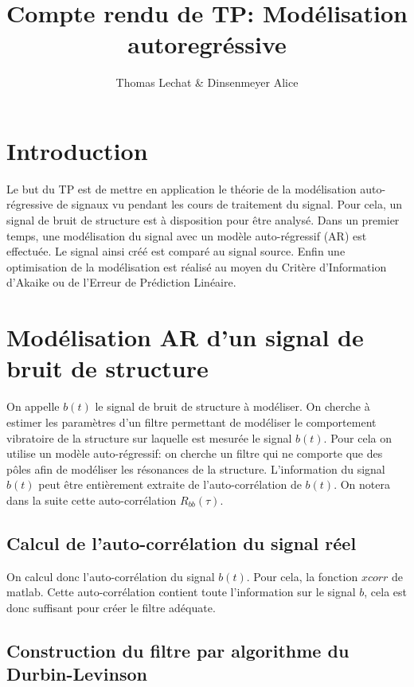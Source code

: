 \documentclass[a4paper]{article}
\title{Compte rendu de TP: Modélisation autoregréssive }
\author{Thomas Lechat \& Dinsenmeyer Alice}
\begin{document}
\maketitle



\section{Introduction}
Le but du TP est de mettre en application le théorie de la modélisation auto-régressive de signaux vu pendant les cours de traitement du signal. Pour cela, un signal de bruit de structure est à disposition pour être analysé. Dans un premier temps, une modélisation du signal avec un modèle auto-régressif (AR) est effectuée. Le signal ainsi créé est comparé au signal source. Enfin une optimisation de la modélisation est réalisé au moyen du Critère d'Information d'Akaike ou de l'Erreur de Prédiction Linéaire.

\section{Modélisation AR d'un signal de bruit de structure}
On appelle $b(t)$ le signal de bruit de structure à modéliser. On cherche à estimer les paramètres d'un filtre permettant de modéliser le comportement vibratoire de la structure sur laquelle est mesurée le signal $b(t)$. Pour cela on utilise un modèle auto-régressif: on cherche un filtre qui ne comporte que des pôles afin de modéliser les résonances de la structure. L'information du signal $b(t)$ peut être entièrement extraite de l'auto-corrélation de $b(t)$. On notera dans la suite cette auto-corrélation $R_{bb}(\tau)$.


\subsection{Calcul de l'auto-corrélation du signal réel}
On calcul donc l'auto-corrélation du signal $b(t)$. Pour cela, la fonction $xcorr$ de matlab. Cette auto-corrélation contient toute l'information sur le signal $b$, cela est donc suffisant pour créer le filtre adéquate.



\subsection{Construction du filtre par algorithme du Durbin-Levinson}
\end{document}
